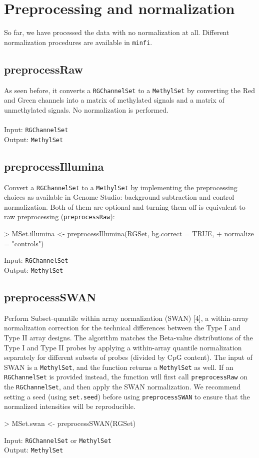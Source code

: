 \documentclass[12pt]{article}
\newcommand{\Rcode}[1]{{\texttt{#1}}}
\begin{document}
\section{Preprocessing and normalization}
So far, we have processed the data with no normalization at all. Different normalization procedures are available in \texttt{minfi}. 
\subsection*{preprocessRaw}
As seen before, it converts a \texttt{RGChannelSet} to a \texttt{MethylSet} by converting the Red and Green channels into a matrix of methylated signals and a matrix of unmethylated signals. No normalization is performed. 
\\
\\
Input: \Rcode{RGChannelSet}\\
Output: \Rcode{MethylSet}
\subsection*{preprocessIllumina}
Convert a \texttt{RGChannelSet} to a \texttt{MethylSet} by implementing the preprocessing choices as available in Genome Studio: background subtraction and control normalization. Both of them are optional and turning them off is equivalent to raw preprocessing (\texttt{preprocessRaw}):
\begin{Schunk}
\begin{Sinput}
> MSet.illumina <- preprocessIllumina(RGSet, bg.correct = TRUE,
+                                normalize = "controls")
\end{Sinput}
\end{Schunk}
Input: \Rcode{RGChannelSet}\\
Output: \Rcode{MethylSet}
\subsection*{preprocessSWAN}
Perform Subset-quantile within array normalization (SWAN) [4], a within-array normalization correction for the technical differences between the Type I and Type II array designs. The algorithm matches the Beta-value distributions of the Type I and Type II probes by applying a within-array quantile normalization separately for different subsets of probes (divided by CpG content). The input of SWAN is a \texttt{MethylSet}, and the function returns a \texttt{MethylSet} as well. If an \texttt{RGChannelSet} is provided instead, the function will first call \texttt{preprocessRaw} on the \texttt{RGChannelSet}, and then apply the SWAN normalization. We recommend setting a seed (using \texttt{set.seed}) before using \texttt{preprocessSWAN} to ensure that the normalized intensities will be reproducible. 
\begin{Schunk}
\begin{Sinput}
> MSet.swan <- preprocessSWAN(RGSet)
\end{Sinput}
\end{Schunk}
Input: \Rcode{RGChannelSet} or \Rcode{MethylSet}\\
Output: \Rcode{MethylSet}
\end{document}
